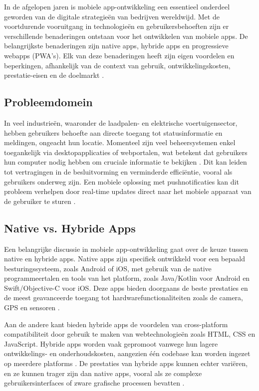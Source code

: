 \noindent In de afgelopen jaren is mobiele app-ontwikkeling een essentieel onderdeel geworden van de digitale strategieën van bedrijven wereldwijd. Met de voortdurende vooruitgang in technologieën en gebruikersbehoeften zijn er verschillende benaderingen ontstaan voor het ontwikkelen van mobiele apps. De belangrijkste benaderingen zijn native apps, hybride apps en progressieve webapps (PWA's). Elk van deze benaderingen heeft zijn eigen voordelen en beperkingen, afhankelijk van de context van gebruik, ontwikkelingskosten, prestatie-eisen en de doelmarkt \autocite{}.

\subsection{Probleemdomein}
\noindent In veel industrieën, waaronder de laadpalen- en elektrische voertuigensector, hebben gebruikers behoefte aan directe toegang tot statusinformatie en meldingen, ongeacht hun locatie. Momenteel zijn veel beheersystemen enkel toegankelijk via desktopapplicaties of webportalen, wat betekent dat gebruikers hun computer nodig hebben om cruciale informatie te bekijken \autocite{}. Dit kan leiden tot vertragingen in de besluitvorming en verminderde efficiëntie, vooral als gebruikers onderweg zijn. Een mobiele oplossing met pushnotificaties kan dit probleem verhelpen door real-time updates direct naar het mobiele apparaat van de gebruiker te sturen \autocite{}.

\subsection{Native vs. Hybride Apps}
\noindent Een belangrijke discussie in mobiele app-ontwikkeling gaat over de keuze tussen native en hybride apps. Native apps zijn specifiek ontwikkeld voor een bepaald besturingssysteem, zoals Android of iOS, met gebruik van de native programmeertalen en tools van het platform, zoals Java/Kotlin voor Android en Swift/Objective-C voor iOS. Deze apps bieden doorgaans de beste prestaties en de meest geavanceerde toegang tot hardwarefunctionaliteiten zoals de camera, GPS en sensoren \autocite{}.

\noindent Aan de andere kant bieden hybride apps de voordelen van cross-platform compatibiliteit door gebruik te maken van webtechnologieën zoals HTML, CSS en JavaScript. Hybride apps worden vaak gepromoot vanwege hun lagere ontwikkelings- en onderhoudskosten, aangezien één codebase kan worden ingezet op meerdere platforms \autocite{}. De prestaties van hybride apps kunnen echter variëren, en ze kunnen trager zijn dan native apps, vooral als ze complexe gebruikersinterfaces of zware grafische processen bevatten \autocite{}.

